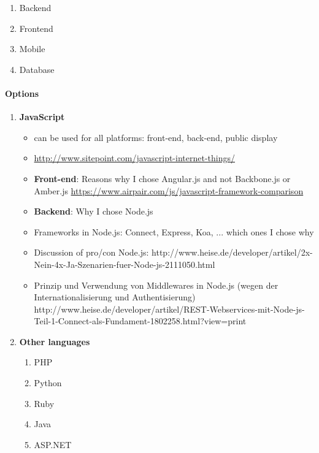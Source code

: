 \begin{enumerate}
\item Backend
\item Frontend
\item Mobile
\item Database
\end{enumerate}



\paragraph{Options}


\begin{enumerate}
\item \textbf{JavaScript}

    \begin{itemize}
        \item can be used for all platforms: front-end, back-end, public display
        \item \url{http://www.sitepoint.com/javascript-internet-things/}
        \item \textbf{Front-end}: Reasons why I chose Angular.js and not Backbone.js or Amber.js \url{https://www.airpair.com/js/javascript-framework-comparison}
        \item \textbf{Backend}: Why I chose Node.js
        \item Frameworks in Node.js: Connect, Express, Koa, ... which ones I chose why
        \item Discussion of pro/con Node.js: http://www.heise.de/developer/artikel/2x-Nein-4x-Ja-Szenarien-fuer-Node-js-2111050.html
        \item Prinzip und Verwendung von Middlewares in Node.js (wegen der Internationalisierung und Authentisierung) http://www.heise.de/developer/artikel/REST-Webservices-mit-Node-js-Teil-1-Connect-als-Fundament-1802258.html?view=print

    \end{itemize}
    
\item \textbf{Other languages}

    \begin{enumerate}
    \item PHP
    \item Python
    \item Ruby
    \item Java
    \item ASP.NET
    \end{enumerate}

\end{enumerate}
    





